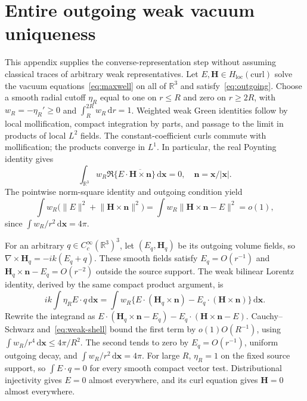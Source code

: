 \documentclass[11pt]{article}
\newcommand{\dd}{\,\mathrm{d}}
\newcommand{\norm}[1]{\lVert #1\rVert}
\newcommand{\abs}[1]{\lvert #1\rvert}
\begin{document}
\section{Entire outgoing weak vacuum uniqueness}\label{app:weak}
This appendix supplies the converse-representation step without assuming classical traces of arbitrary weak representatives. Let $E,\mathbf H\in H_{\mathrm{loc}}(\mathrm{curl})$ solve the vacuum equations~\eqref{eq:maxwell} on all of $\mathbb R^3$ and satisfy~\eqref{eq:outgoing}. Choose a smooth radial cutoff $\eta_R$ equal to one on $r\leq R$ and zero on $r\geq2R$, with $w_R=-\eta_R'\geq0$ and $\int_R^{2R}w_R\dd r=1$. Weighted weak Green identities follow by local mollification, compact integration by parts, and passage to the limit in products of local $L^2$ fields. The constant-coefficient curls commute with mollification; the products converge in $L^1$. In particular, the real Poynting identity gives
\begin{equation}\label{eq:weak-energy}
 \int_{\mathbb R^3}w_R\Re\{E\cdot\overline{\mathbf H\times\mathbf n}\}\dd\mathbf x=0,
 \quad\mathbf n=\mathbf x/\abs{\mathbf x}.
\end{equation}
The pointwise norm-square identity and outgoing condition yield
\begin{equation}\label{eq:weak-shell}
 \int w_R\bigl(\norm E^2+\norm{\mathbf H\times\mathbf n}^2\bigr)
 =\int w_R\norm{\mathbf H\times\mathbf n-E}^2=o(1),
\end{equation}
since $\int w_R/r^2\dd\mathbf x=4\pi$.

For an arbitrary $q\in C_c^\infty(\mathbb R^3)^3$, let $(E_q,\mathbf H_q)$ be its outgoing volume fields, so $\nabla\times\mathbf H_q=-ik(E_q+q)$. These smooth fields satisfy $E_q=O(r^{-1})$ and $\mathbf H_q\times\mathbf n-E_q=O(r^{-2})$ outside the source support. The weak bilinear Lorentz identity, derived by the same compact product argument, is
\begin{equation}\label{eq:weak-lorentz}
 ik\int\eta_R E\cdot q\dd\mathbf x
 =\int w_R\{E\cdot(\mathbf H_q\times\mathbf n)
                  -E_q\cdot(\mathbf H\times\mathbf n)\}\dd\mathbf x.
\end{equation}
Rewrite the integrand as $E\cdot(\mathbf H_q\times\mathbf n-E_q)-E_q\cdot(\mathbf H\times\mathbf n-E)$. Cauchy--Schwarz and~\eqref{eq:weak-shell} bound the first term by $o(1)O(R^{-1})$, using $\int w_R/r^4\dd\mathbf x\leq4\pi/R^2$. The second tends to zero by $E_q=O(r^{-1})$, uniform outgoing decay, and $\int w_R/r^2\dd\mathbf x=4\pi$. For large $R$, $\eta_R=1$ on the fixed source support, so $\int E\cdot q=0$ for every smooth compact vector test. Distributional injectivity gives $E=0$ almost everywhere, and its curl equation gives $\mathbf H=0$ almost everywhere.
\end{document}
